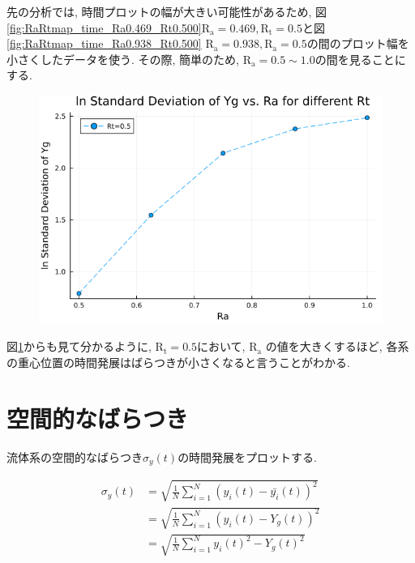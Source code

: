 先の分析では, 時間プロットの幅が大きい可能性があるため, 図\ref{fig:RaRtmap_time_Ra0.469_Rt0.500}$\text{R}_\text{a} = 0.469, \text{R}_\text{t} = 0.5$と図\ref{fig:RaRtmap_time_Ra0.938_Rt0.500} $\text{R}_\text{a} = 0.938, \text{R}_\text{a} = 0.5$の間のプロット幅を小さくしたデータを使う. その際, 簡単のため, $\text{R}_\text{a} =0.5 \sim 1.0$の間を見ることにする.



\begin{figure}[H]
  \centering
  \includegraphics[scale=0.5]{image/lnStdYg_Ra0.5to1.0_Rt0.5_ti25000.png}
  \caption{}
  \label{fig:lnStdYg_Ra0.5to1.0_Rt0.5_ti25000}
\end{figure}

図\ref{fig:lnStdYg_Ra0.5to1.0_Rt0.5_ti25000}からも見て分かるように, $\text{R}_\text{t} = 0.5$において, $\text{R}_\text{a}$ の値を大きくするほど, 各系の重心位置の時間発展はばらつきが小さくなると言うことがわかる.


\section{空間的なばらつき}

流体系の空間的なばらつき$\sigma_{y} (t)$の時間発展をプロットする.

\begin{align}
  \sigma_{y} (t)
  &= \sqrt{\frac{1}{N} \sum_{i=1}^{N} (y_i (t) - \bar{y_i}(t) )^2} \\
  &= \sqrt{\frac{1}{N} \sum_{i=1}^{N} (y_i (t) - Y_g (t) )^2} \\
  &= \sqrt{\frac{1}{N} \sum_{i=1}^{N} {{y_i} (t)}^2 - {{Y_g} (t)}^2}
\end{align}

